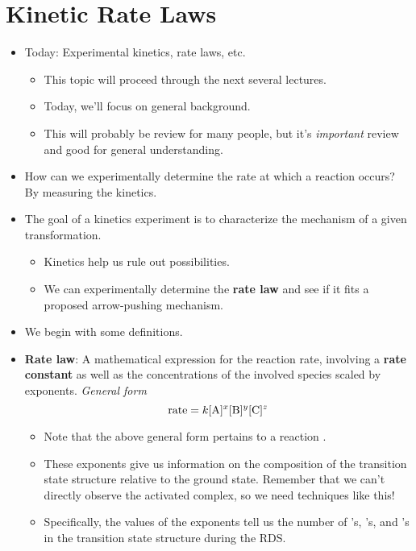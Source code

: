 \documentclass[../notes.tex]{subfiles}
\begin{document}
\section{Kinetic Rate Laws}
\begin{itemize}
    \item {}Today: Experimental kinetics, rate laws, etc.
    \begin{itemize}
        \item This topic will proceed through the next several lectures.
        \item Today, we'll focus on general background.
        \item This will probably be review for many people, but it's \emph{important} review and good for general understanding.
    \end{itemize}
    \item How can we experimentally determine the rate at which a reaction occurs? By measuring the kinetics.
    \item The goal of a kinetics experiment is to characterize the mechanism of a given transformation.
    \begin{itemize}
        \item Kinetics help us rule out possibilities.
        \item We can experimentally determine the \textbf{rate law} and see if it fits a proposed arrow-pushing mechanism.
    \end{itemize}
    \item We begin with some definitions.
    \item \textbf{Rate law}: A mathematical expression for the reaction rate, involving a \textbf{rate constant} as well as the concentrations of the involved species scaled by exponents. \emph{General form}
    \begin{equation*}
        \rate = k\cnc{A}^x\cnc{B}^y\cnc{C}^z
    \end{equation*}
    \begin{itemize}
        \item Note that the above general form pertains to a reaction .
        \item These exponents give us information on the composition of the transition state structure relative to the ground state. Remember that we can't directly observe the activated complex, so we need techniques like this!
        \item Specifically, the values of the exponents tell us the number of 's, 's, and 's in the transition state structure during the RDS.

\end{itemize}
\end{itemize}
\end{document}
